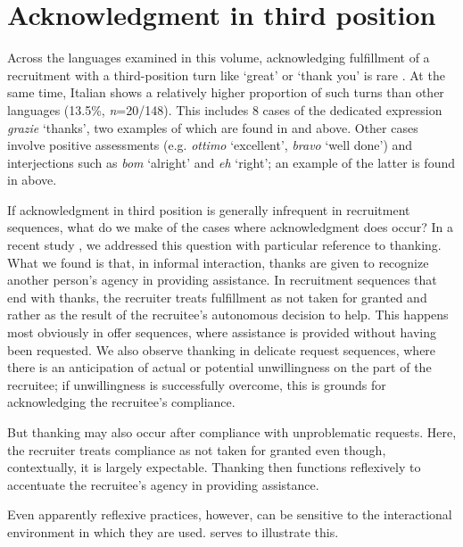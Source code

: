 \documentclass[output=paper,modfonts]{langscibook}
\begin{document}
\section{Acknowledgment in third position}\label{sec:rossi:5}
Across the languages examined in this volume, acknowledging fulfillment of a recruitment with a third-position turn like ‘great’ or ‘thank you’ is rare \citep{FloydEtAl2018}. At the same time, Italian shows a relatively higher proportion of such turns than other languages (13.5\%, \textit{n}=20/148). This includes 8 cases of the dedicated expression \textit{grazie} ‘thanks’, two examples of which are found in  and  above. Other cases involve positive assessments (e.g. \textit{ottimo} ‘excellent’, \textit{bravo} ‘well done’) and interjections such as \textit{bom} ‘alright’ and \textit{eh} ‘right’; an example of the latter is found in  above. %

If acknowledgment in third position is generally infrequent in recruitment sequences, what do we make of the cases where acknowledgment does occur? In a recent study \citep{ZinkenRossiReddy}, we addressed this question with particular reference to thanking. What we found is that, in informal interaction, thanks are given to recognize another person's agency in providing assistance. In recruitment sequences that end with thanks, the recruiter treats fulfillment as not taken for granted and rather as the result of the recruitee's autonomous decision to help. This happens most obviously in offer sequences, where assistance is provided without having been requested. We also observe thanking in delicate request sequences, where there is an anticipation of actual or potential unwillingness on the part of the recruitee; if unwillingness is successfully overcome, this is grounds for acknowledging the recruitee's compliance. %

But thanking may also occur after compliance with unproblematic requests. Here, the recruiter treats compliance as not taken for granted even though, contextually, it is largely expectable. Thanking then functions reflexively to accentuate the recruitee's agency in providing assistance. 

Even apparently reflexive practices, however, can be sensitive to the interactional environment in which they are used.  serves to illustrate this.
\end{document}
